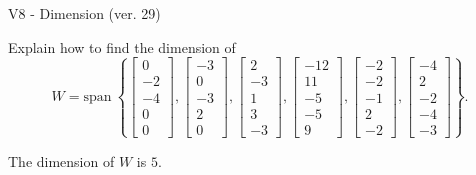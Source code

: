 \begin{exercise}
  \begin{exerciseTitle}V8 - Dimension (ver. 29)\end{exerciseTitle}
  \begin{exerciseStatement}
    Explain how to find the dimension of 
\[W=\mathrm{span}\ \left\{\left[\begin{array}{r}
0 \\
-2 \\
-4 \\
0 \\
0
\end{array}\right] , \left[\begin{array}{r}
-3 \\
0 \\
-3 \\
2 \\
0
\end{array}\right] , \left[\begin{array}{r}
2 \\
-3 \\
1 \\
3 \\
-3
\end{array}\right] , \left[\begin{array}{r}
-12 \\
11 \\
-5 \\
-5 \\
9
\end{array}\right] , \left[\begin{array}{r}
-2 \\
-2 \\
-1 \\
2 \\
-2
\end{array}\right] , \left[\begin{array}{r}
-4 \\
2 \\
-2 \\
-4 \\
-3
\end{array}\right]\right\}.\]



  \end{exerciseStatement}
  \begin{exerciseAnswer}
   The dimension of \(W\) is  \(5\).
  


  \end{exerciseAnswer}
\end{exercise}
